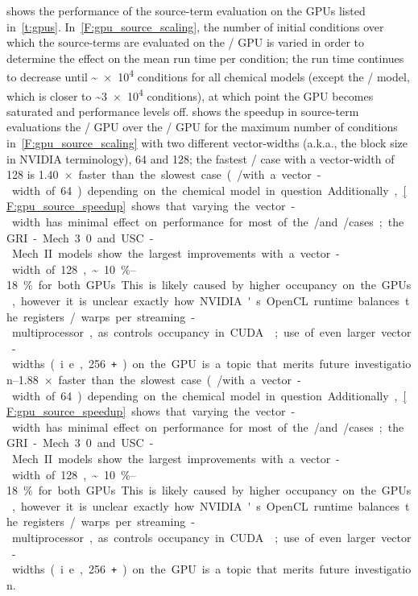 \documentclass[12pt,number,sort&compress,preprint]{elsarticle}
\begin{document}
 shows the performance of the source-term evaluation on the GPUs listed in~\cref{t:gpus}.
In~\cref{F:gpu_source_scaling}, the number of initial conditions over which the source-terms are evaluated on the \gpunew/ GPU is varied in order to determine the effect on the mean run time per condition; the run time continues to decrease until \textasciitilde\num{e4} conditions for all chemical models (except the \slash{} model, which is closer to \textasciitilde\num{3e4} conditions), at which point the GPU becomes saturated and performance levels off.
 shows the speedup in source-term evaluations the \gpunew/ GPU over the \gpuold/ GPU for the maximum number of conditions in~\cref{F:gpu_source_scaling} with two different vector-widths (a.k.a., the block size in NVIDIA terminology), \num{64} and \num{128}; the fastest \gpunew/ case with a vector-width of 128 is \SIrange{1.40}{1.88}{$\times$} faster than the slowest case (\gpuold/ with a vector-width of \num{64}) depending on the chemical model in question.
Additionally,~\cref{F:gpu_source_speedup} shows that varying the vector-width has minimal effect on performance for most of the \gpunew/ and \gpuold/ cases; the GRI-Mech 3.0 and USC-Mech II models show the largest improvements with a vector-width of \num{128}, \textasciitilde\SIrange{10}{18}{\percent} for both GPUs.
This is likely caused by higher occupancy on the GPUs, however it is unclear exactly how NVIDIA's OpenCL runtime balances the registers\slash warps per streaming-multiprocessor, as controls occupancy in CUDA~\cite{occupancy}; use of even larger vector-widths (i.e., \num{256}\texttt{+}) on the GPU is a topic that merits future investigation.
\end{document}
